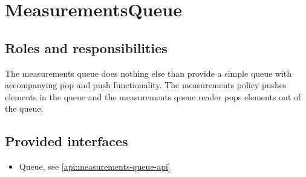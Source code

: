\section{MeasurementsQueue}
\label{element:measurements-queue}

\subsection{Roles and responsibilities}

\npar The measurements queue does nothing else than provide a simple queue with
accompanying pop and push functionality. The measurements policy pushes elements
in the queue and the measurements queue reader pops elements out of the queue.

\subsection{Provided interfaces}

\begin{itemize}
  \item Queue, see \ref{api:measurements-queue-api}
\end{itemize}